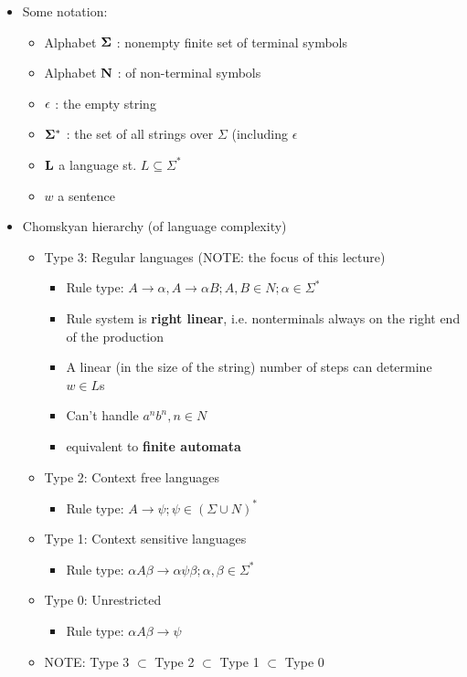 \documentclass[11pt]{article}
\begin{document}
\begin{itemize}
 \item Some notation:
  \begin{itemize}
    \item Alphabet ${\bf\Sigma}$ : nonempty finite set of terminal symbols
    \item Alphabet ${\bf N}$ : of non-terminal symbols
    \item ${\bf\epsilon}$ : the empty string
    \item ${\bf\Sigma^*}$ : the set of all strings over $\Sigma$ (including $\epsilon$
    \item ${\bf L}$ a language st. $L \subseteq \Sigma^*$
    \item $w$ a sentence
  \end{itemize}
 \item Chomskyan hierarchy (of language complexity)
  \begin{itemize}
   \item Type 3: Regular languages (NOTE: the focus of this lecture)
    \begin{itemize}
     \item Rule type: $A \rightarrow \alpha, A \rightarrow \alpha B; A,B \in N; \alpha \in \Sigma^*$
     \item Rule system is {\bf right linear}, i.e. nonterminals always on the right end of the production
     \item A linear (in the size of the string) number of steps can determine $w \in L$s
     \item Can't handle $a^n b^n , n \in N$
     \item equivalent to {\bf finite automata}
    \end{itemize}
   \item Type 2: Context free languages
    \begin{itemize}
     \item Rule type: $A \rightarrow \psi; \psi \in (\Sigma \cup N)^*$
    \end{itemize}   
   \item Type 1: Context sensitive languages
    \begin{itemize}
     \item Rule type: $\alpha A \beta \rightarrow \alpha \psi \beta; \alpha, \beta \in \Sigma^*$
    \end{itemize}
   \item Type 0: Unrestricted
    \begin{itemize}
     \item Rule type: $\alpha A \beta \rightarrow \psi$
    \end{itemize}
   \item NOTE: Type 3 $\subset$ Type 2 $\subset$ Type 1 $\subset$ Type 0
  \end{itemize}
\end{itemize}
\end{document}

